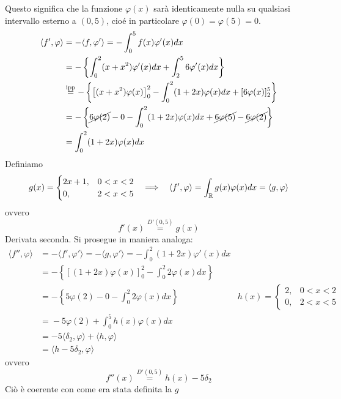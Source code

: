 Questo significa che la funzione $\varphi (x)$ sarà identicamente nulla su qualsiasi intervallo esterno a $(0,5)$, cioé in particolare $\varphi (0) = \varphi (5) = 0$.
\begin{align*}
\langle f',\varphi \rangle  & = - \langle f,\varphi '\rangle = - \int ^{5}_{0} f(x)\varphi '(x)dx\\
 & = - \left\{\int ^{2}_{0} (x + x^{2})\varphi '(x)dx + \int ^{5}_{2} 6\varphi '(x)dx\right\}\\
 & \overset{\text{ipp}}{ = } - \left\{\left[ (x + x^{2})\varphi (x)\right]^{2}_{0} - \int ^{2}_{0} (1 + 2x)\varphi (x)dx + [ 6\varphi (x)]^{5}_{2}\right\}\\
 & = - \left\{\cancel{6\varphi (2)} - 0 - \int ^{2}_{0}(1 + 2x) \varphi (x) dx + \cancel{6\varphi (5)} - \cancel{6\varphi (2)}\right\}\\
 & = \int ^{2}_{0}(1 + 2x) \varphi (x) dx
\end{align*}
Definiamo
\begin{equation*}
g(x) = 
\begin{cases}
2x + 1, & 0 < x < 2\\
0, & 2 < x < 5
\end{cases} \ \ \implies \ \ \langle f',\varphi \rangle = \int _{\mathbb{R} } g(x) \varphi (x) dx = \langle g,\varphi \rangle 
\end{equation*}
ovvero
\begin{equation*}
f'(x)\overset{D'(0,5)}{ = } g(x)
\end{equation*}
Derivata seconda. Si prosegue in maniera analoga:
\begin{equation*}
\begin{aligned}
\langle f'',\varphi \rangle  & = - \langle f',\varphi '\rangle = - \langle g,\varphi '\rangle = - \int ^{2}_{0} (1 + 2x)\varphi '(x)dx & \\
 & = - \left\{[ (1 + 2x)\varphi (x)]^{2}_{0} - \int ^{2}_{0} 2\varphi (x)dx\right\} & \\
 & = - \left\{5\varphi (2) - 0 - \int ^{2}_{0} 2\varphi (x)dx\right\} & h(x) = 
 \begin{cases}
2, & 0 < x < 2\\
0, & 2 < x < 5
\end{cases}\\
 & \overset{}{ = } - 5\varphi (2) + \int ^{5}_{0} h(x)\varphi (x)dx & \\
 & = - 5\langle \delta _{2} ,\varphi \rangle + \langle h,\varphi \rangle  & \\
 & = \langle h - 5\delta _{2} ,\varphi \rangle  & 
\end{aligned}
\end{equation*}
ovvero
\begin{equation*}
f''(x)\overset{D'(0,5)}{ = } h(x) - 5\delta _{2}
\end{equation*}
Ciò è coerente con come era stata definita la $g$


